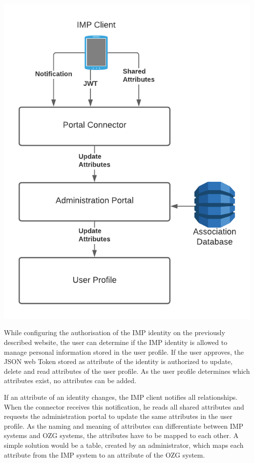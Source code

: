 \documentclass[
     12pt,         %
     a4paper,      %
     BCOR=10mm,version=first,     %
     DIV=14,version=first,        %
     ]{scrreprt}
\begin{document}
\begin{center}
    \includegraphics[width=15cm]{Diagrams/Integration 1/Personal Information/Overview.png}
\end{center}

While configuring the authorisation of the IMP identity on the previously described website, the user can determine if the IMP identity is allowed to manage personal information stored in the user profile. If the user approves, the JSON web Token stored as attribute of the identity is authorized to update, delete and read attributes of the user profile. As the user profile determines which attributes exist, no attributes can be added.

If an attribute of an identity changes, the IMP client notifies all relationships. When the connector receives this notification, he reads all shared attributes and requests the administration portal to update the same attributes in the user profile. As the naming and meaning of attributes can differentiate between IMP systems and OZG systems, the attributes have to be mapped to each other. A simple solution would be a table, created by an administrator, which maps each attribute from the IMP system to an attribute of the OZG system.
\end{document}
